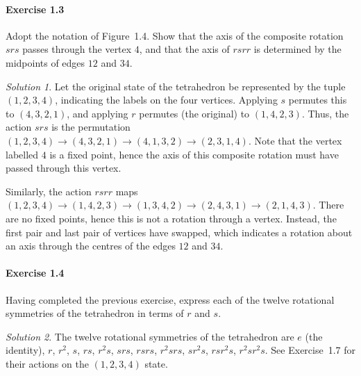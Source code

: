 \documentclass[11pt]{report}
\theoremstyle{remark}
\newtheorem*{solution}{Solution}
\begin{document}
    \paragraph{Exercise 1.3} Adopt the notation of Figure~1.4. Show that the axis of
    the composite rotation $srs$ passes through the vertex $4$, and that the axis of
    $rsrr$ is determined by the midpoints of edges $12$ and $34$.
    \begin{solution}
        Let the original state of the tetrahedron be represented by the tuple $(1,
        2, 3, 4)$, indicating the labels on the four vertices. Applying $s$ permutes
        this to $(4, 3, 2, 1)$, and applying $r$ permutes (the original) to $(1, 4,
        2, 3)$. Thus, the action $srs$ is the permutation $(1, 2, 3, 4) \to (4, 3,
        2, 1) \to (4, 1, 3, 2) \to (2, 3, 1, 4)$. Note that the vertex labelled $4$
        is a fixed point, hence the axis of this composite rotation must have passed
        through this vertex.

        Similarly, the action $rsrr$ maps $(1, 2, 3, 4) \to (1, 4, 2, 3) \to (1, 3,
        4, 2) \to (2, 4, 3, 1) \to (2, 1, 4, 3)$. There are no fixed points, hence
        this is not a rotation through a vertex. Instead, the first pair and last
        pair of vertices have swapped, which indicates a rotation about an axis
        through the centres of the edges $12$ and $34$.
    \end{solution}

    \paragraph{Exercise 1.4} Having completed the previous exercise, express each of
    the twelve rotational symmetries of the tetrahedron in terms of $r$ and $s$.
    \begin{solution}
        The twelve rotational symmetries of the tetrahedron are $e$ (the identity),
        $r$, $r^2$, $s$, $rs$, $r^2s$, $srs$, $rsrs$, $r^2srs$, $sr^2s$, $rsr^2s$,
        $r^2sr^2s$. See Exercise~1.7 for their actions on the $(1, 2, 3, 4)$ state.
    \end{solution}
\end{document}
